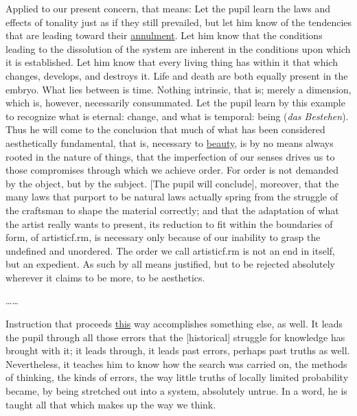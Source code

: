 \documentclass[oneside,12pt]{article}
\begin{document}
\begin{mdframed}
Applied to our present concern, that means: Let the pupil learn the laws and effects of tonality just as if they still prevailed, but let him know of the tendencies that are leading toward their \uline{annulment}. Let him know that the conditions leading to the dissolution of the system are inherent in the conditions upon which it is established. Let him know that every living thing has within it that which changes, develops, and destroys it. Life and death are both equally present in the embryo. What lies between is time. Nothing intrinsic, that is; merely a dimension, which is, however, necessarily consummated. Let the pupil learn by this example to recognize what is eternal: change, and what is temporal: being (\emph{das Bestehen}). Thus he will come to the conclusion that much of what has been considered aesthetically fundamental, that is, necessary to \uline{beauty}, is by no means always rooted in the nature of things, that the imperfection of our senses drives us to those compromises through which we achieve order. For order is not demanded by the object, but by the subject. [The pupil will conclude], moreover, that the many laws that purport to be natural laws actually spring from the struggle of the craftsman to shape the material correctly; and that the adaptation of what the artist really wants to present, its reduction to fit within the boundaries of form, of artisticf.rm, is necessary only because of our inability to grasp the undefined and unordered. The order we call artisticf.rm is not an end in itself, but an expedient. As such by all means justified, but to be rejected absolutely wherever it claims to be more, to be aesthetics.

\ldots\ldots{}

Instruction that proceeds \uline{this} way accomplishes something else, as well. It leads the pupil through all those errors that the [historical] struggle for knowledge has brought with it; it leads through, it leads past errors, perhaps past truths as well. Nevertheless, it teaches him to know how the search was carried on, the methods of thinking, the kinds of errors, the way little truths of locally limited probability became, by being stretched out into a system, absolutely untrue. In a word, he is taught all that which makes up the way we think.


\end{mdframed}
\end{document}
